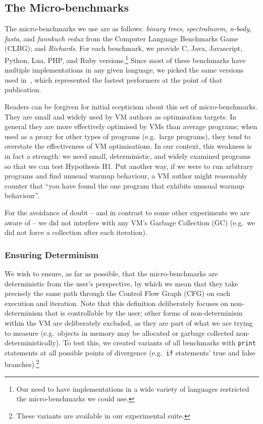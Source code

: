 \documentclass[a4paper,UKenglish]{lipics}
\newcommand{\hypone}{H1\xspace}
\newcommand{\binarytrees}{\emph{binary trees}\xspace}
\newcommand{\richards}{\emph{Richards}\xspace}
\newcommand{\spectralnorm}{\emph{spectralnorm}\xspace}
\newcommand{\nbody}{\emph{n-body}\xspace}
\newcommand{\fasta}{\emph{fasta}\xspace}
\newcommand{\fannkuch}{\emph{fannkuch redux}\xspace}
\begin{document}
\subsection{The Micro-benchmarks}

The micro-benchmarks we use are as follows: \binarytrees, \spectralnorm, \nbody,
\fasta, and \fannkuch from the Computer Language Benchmarks Game (CLBG); and
\richards. For each benchmark, we provide C, Java, Javascript, Python, Lua, PHP,
and Ruby versions.\footnote{Our need to have implementations in a wide variety
of languages restricted the micro-benchmarks we could use.} Since most of these
benchmarks have multiple implementations in any given language, we picked
the same versions used in~\cite{bolz14impact}, which represented the fastest
performers at the point of that publication.

Readers can be forgiven for initial scepticism about this set of micro-benchmarks.
They are small and widely
used by VM authors as optimisation targets. In general they are more effectively
optimised by VMs than average programs; when used as a proxy for other types
of programs (e.g.~large programs), they tend to overstate the effectiveness of
VM optimisations. In our context, this weakness is in fact a strength: we need
small, deterministic, and widely examined programs so that we can test
Hypothesis \hypone. Put another way, if we were to run arbitrary programs
and find unusual warmup behaviour, a VM author might reasonably counter that
``you have found the one program that exhibits unusual warmup behaviour''.

For the avoidance of doubt -- and in
contrast to some other experiments we are aware of -- we
did not interfere with any VM's Garbage Collection (GC) (e.g.~we did not
force a collection after each iteration).


\subsubsection{Ensuring Determinism}

We wish to ensure, as far as possible, that the micro-benchmarks are
deterministic from the user's perspective, by which we mean that they
take precisely the same path through the Control Flow Graph (CFG) on each
execution and iteration. Note that this definition deliberately focuses
on non-determinism that is controllable by the user; other forms of
non-determinism within the VM are deliberately excluded, as they are
part of what we are trying to measure (e.g.~objects in memory may be allocated
or garbage collected non-deterministically). To test this, we created variants
of all benchmarks with \texttt{print} statements at all possible points of
divergence (e.g.~\texttt{if} statements' true and false branches).\footnote{These
variants are available in our experimental suite.}
\end{document}
